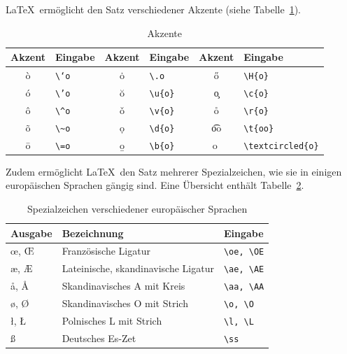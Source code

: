 \LaTeX\ ermöglicht den Satz verschiedener Akzente (siehe Tabelle~\ref{Tabelle_Akzente}). 

\begin{table}[h!tb]
\centering
\caption{Akzente}
\label{Tabelle_Akzente}       %
\begin{tabular}{clclcl}
\hline
Akzent & Eingabe & Akzent & Eingabe & Akzent & Eingabe\\
\hline
\`o & \texttt{\textbackslash \textquoteleft o} & \.o & \texttt{\textbackslash .o} & \H{o} & \texttt{\textbackslash H\{o\}} \\
\'o & \texttt{\textbackslash \textquoteright o} & \u{o} & \texttt{\textbackslash u\{o\}} & \c{o} & \texttt{\textbackslash c\{o\}} \\
\^o & \texttt{\textbackslash \textasciicircum o} & \v{o} & \texttt{\textbackslash v\{o\}} & \r{o} & \texttt{\textbackslash r\{o\}} \\
\~o & \texttt{\textbackslash \textasciitilde o} & \d{o} & \texttt{\textbackslash d\{o\}} & \t{oo} & \texttt{\textbackslash t\{oo\}} \\
\=o & \texttt{\textbackslash =o} & \b{o} & \texttt{\textbackslash b\{o\}} & \textcircled{o} & \texttt{\textbackslash textcircled\{o\}} \\
\hline
\end{tabular}
\end{table}

Zudem ermöglicht \LaTeX\ den Satz mehrerer Spezialzeichen, 
wie sie in einigen europäischen 
Sprachen gängig sind. Eine Übersicht enthält Tabelle~\ref{Tabelle_Spezialzeichen}. 

\begin{table}[h!tb]
\centering
\caption{Spezialzeichen verschiedener europäischer Sprachen}
\label{Tabelle_Spezialzeichen}       %
\begin{tabular}{lll}
\hline
Ausgabe & Bezeichnung & Eingabe \\
\hline
\oe, \OE & Französische Ligatur & \texttt{\textbackslash oe, \textbackslash OE}\\
\ae, \AE & Lateinische, skandinavische Ligatur & \texttt{\textbackslash ae, \textbackslash AE} \\
\aa, \AA & Skandinavisches A mit Kreis & \texttt{\textbackslash aa, \textbackslash AA}\\
\o, \O & Skandinavisches O mit Strich & \texttt{\textbackslash o, \textbackslash O}\\   
\l, \L & Polnisches L mit Strich & \texttt{\textbackslash l, \textbackslash L}\\
\ss & Deutsches Es-Zet & \texttt{\textbackslash ss}\\
\hline
\end{tabular}
\end{table}


